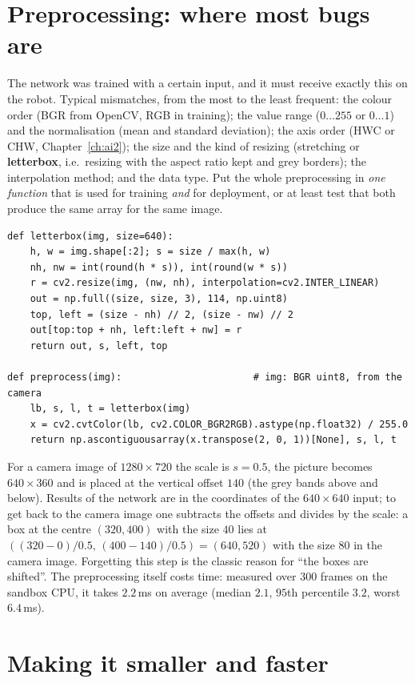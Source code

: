 \section*{Preprocessing: where most bugs are}
The network was trained with a certain input, and it must receive exactly this on the robot. Typical mismatches, from the most to the least frequent: the colour order (BGR from OpenCV, RGB in training); the value range ($0\dots255$ or $0\dots1$) and the normalisation (mean and standard deviation); the axis order (HWC or CHW, Chapter~\ref{ch:ai2}); the size and the kind of resizing (stretching or \textbf{letterbox}, i.e.\ resizing with the aspect ratio kept and grey borders); the interpolation method; and the data type. Put the whole preprocessing in \emph{one function} that is used for training \emph{and} for deployment, or at least test that both produce the same array for the same image.
\begin{verbatim}
def letterbox(img, size=640):
    h, w = img.shape[:2]; s = size / max(h, w)
    nh, nw = int(round(h * s)), int(round(w * s))
    r = cv2.resize(img, (nw, nh), interpolation=cv2.INTER_LINEAR)
    out = np.full((size, size, 3), 114, np.uint8)
    top, left = (size - nh) // 2, (size - nw) // 2
    out[top:top + nh, left:left + nw] = r
    return out, s, left, top

def preprocess(img):                       # img: BGR uint8, from the camera
    lb, s, l, t = letterbox(img)
    x = cv2.cvtColor(lb, cv2.COLOR_BGR2RGB).astype(np.float32) / 255.0
    return np.ascontiguousarray(x.transpose(2, 0, 1))[None], s, l, t
\end{verbatim}
For a camera image of $1280\times720$ the scale is $s=0.5$, the picture becomes $640\times360$ and is placed at the vertical offset $140$ (the grey bands above and below). Results of the network are in the coordinates of the $640\times640$ input; to get back to the camera image one subtracts the offsets and divides by the scale: a box at the centre $(320,400)$ with the size $40$ lies at $((320-0)/0.5,\,(400-140)/0.5)=(640,520)$ with the size $80$ in the camera image. Forgetting this step is the classic reason for ``the boxes are shifted''. The preprocessing itself costs time: measured over $300$ frames on the sandbox CPU, it takes $2.2$\,ms on average (median $2.1$, $95$th percentile $3.2$, worst $6.4$\,ms).

\section*{Making it smaller and faster}
